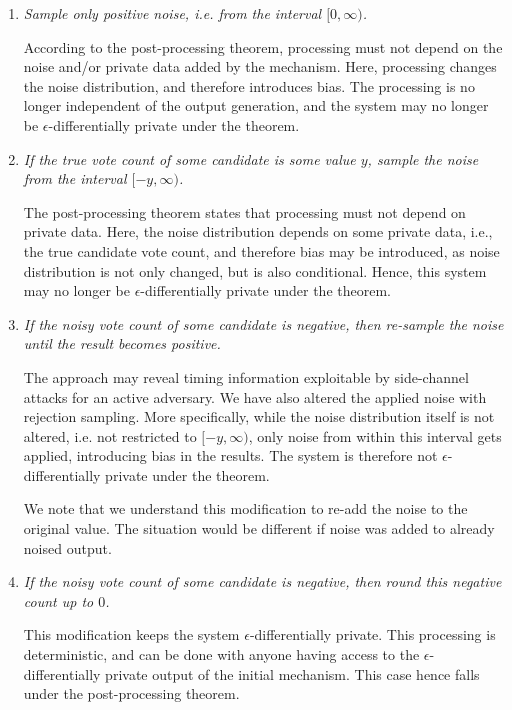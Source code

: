 \documentclass[parskip=half]{scrartcl}
\begin{document}
\begin{enumerate}
    \item \textit{Sample only positive noise, i.e. from the interval
    $[0, \infty)$.}

    According to the post-processing theorem, processing must not depend on the
    noise and/or private data added by the mechanism. Here, processing changes
    the noise distribution, and therefore introduces bias. The processing is no
    longer independent of the output generation, and the system may no longer
    be $\epsilon$-differentially private under the theorem.

    \item \textit{If the true vote count of some candidate is some value $y$,
    sample the noise from the interval $[-y, \infty)$.}

    The post-processing theorem states that processing must not depend
    on private data. Here, the noise distribution depends on some private data,
    i.e., the true candidate vote count, and therefore bias may be introduced,
    as noise distribution is not only changed, but is also conditional. Hence,
    this system may no longer be $\epsilon$-differentially private under the
    theorem.

    \item \textit{If the noisy vote count of some candidate is negative, then
    re-sample the noise until the result becomes positive.}
    
    The approach may reveal timing information exploitable by side-channel
    attacks for an active adversary. We have also altered the applied noise
    with rejection sampling. More specifically, while the noise distribution
    itself is not altered, i.e. not restricted to $[-y, \infty)$, only noise
    from within this interval gets applied, introducing bias in the results.
    The system is therefore not $\epsilon$-differentially private under the
    theorem.

    We note that we understand this modification to re-add the noise to the
    original value. The situation would be different if noise was added to
    already noised output.

    \item \textit{If the noisy vote count of some candidate is negative, then
    round this negative count up to $0$.}

    This modification keeps the system $\epsilon$-differentially private. This
    processing is deterministic, and can be done with anyone having access to
    the $\epsilon$-differentially private output of the initial mechanism. This
    case hence falls under the post-processing theorem.
\end{enumerate}
\end{document}
